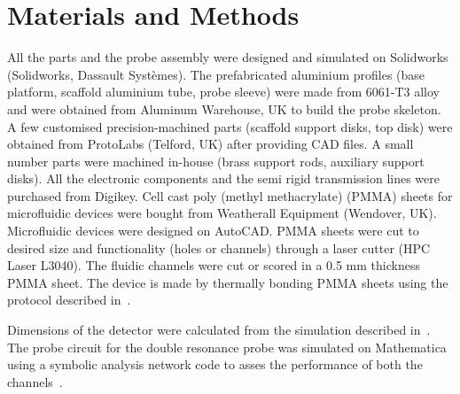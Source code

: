 \documentclass[preprint,12pt]{article}
\begin{document}
\section{Materials and Methods}
All the parts and the probe assembly were designed and simulated on Solidworks (Solidworks, Dassault Syst\`{e}mes). The prefabricated aluminium profiles (base platform, scaffold aluminium tube, probe sleeve) were made from 6061-T3 alloy and were obtained from Aluminum Warehouse, UK to build the probe skeleton. A few customised precision-machined parts (scaffold support disks, top disk) were obtained from ProtoLabs (Telford, UK) after providing CAD files. A small number parts were machined in-house (brass support rods, auxiliary support disks). All the electronic components and the semi rigid transmission lines were purchased from Digikey. Cell cast poly (methyl methacrylate) (PMMA) sheets for microfluidic devices were bought from Weatherall Equipment (Wendover, UK). Microfluidic devices were designed on AutoCAD. PMMA sheets were cut to desired size and functionality (holes or channels) through a laser cutter (HPC Laser L3040). The fluidic channels were cut or scored in a 0.5 mm thickness PMMA sheet. The device is made by thermally bonding PMMA sheets using the protocol described in~\cite{yilmaz_bonding}.\par
Dimensions of the detector were calculated from the simulation described in~\cite{gream_2016}. The probe circuit for the double resonance probe was simulated on Mathematica using a symbolic analysis network code to asses the performance of both the channels~\cite{gream-thesis}.\par
\end{document}
